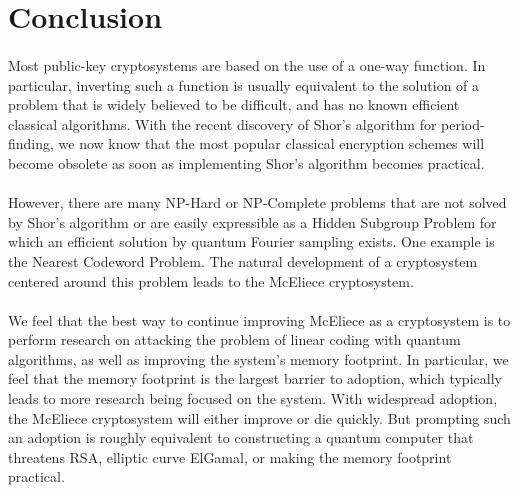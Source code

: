 \documentclass[12pt]{article}
\theoremstyle{definition}
\begin{document}
\section{Conclusion}
\paragraph{}
Most public-key cryptosystems are based on the use of a one-way function. In particular, inverting such a function is usually equivalent to the solution of a problem that is widely believed to be difficult, and has no known efficient classical algorithms. With the recent discovery of Shor's algorithm for period-finding, we now know that the most popular classical encryption schemes will become obsolete as soon as implementing Shor's algorithm becomes practical. 

\paragraph{}
However, there are many NP-Hard or NP-Complete problems that are not solved by Shor's algorithm or are easily expressible as a Hidden Subgroup Problem for which an efficient solution by quantum Fourier sampling exists. One example is the Nearest Codeword Problem. The natural development of a cryptosystem centered around this problem leads to the McEliece cryptosystem. 

\paragraph{}
We feel that the best way to continue improving McEliece as a cryptosystem is to perform research on attacking the problem of linear coding with quantum algorithms, as well as improving the system's memory footprint. In particular, we feel that the memory footprint is the largest barrier to adoption, which typically leads to more research being focused on the system. With widespread adoption, the McEliece cryptosystem will either improve or die quickly. But prompting such an adoption is roughly equivalent to constructing a quantum computer that threatens RSA, elliptic curve ElGamal, or making the memory footprint practical.
\end{document}

